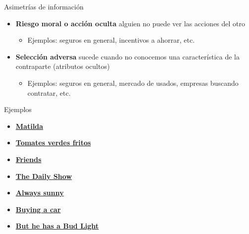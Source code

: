 \documentclass{beamer}
\begin{document}
\begin{frame}{Asimetrías de información}
    \begin{itemize}
        \item {\textbf{Riesgo moral o acción oculta}} alguien no puede ver las acciones del otro
            \begin{itemize}
            \item Ejemplos: seguros en general, incentivos a ahorrar, etc. 
            \end{itemize}
            \vspace{3mm}
        \item {\textbf{Selección adversa}} sucede cuando no conocemos una característica de la contraparte (atributos ocultos)
            \begin{itemize}
            \item Ejemplos: seguros en general, mercado de usados, empresas buscando contratar, etc.  
            \end{itemize}
            \end{itemize}
    \end{frame}

\begin{frame}{Ejemplos}
    \begin{itemize}
    \item \href{https://www.youtube.com/watch?v=qlg0qakJhKU}{\textbf{Matilda}}
    \item \href{https://www.youtube.com/watch?v=akA8co61He4}{\textbf{Tomates verdes fritos}}
    \item \href{https://www.youtube.com/watch?v=X8BPfLhH6MA}{\textbf{Friends}}
    \item \href{https://videos.criticalcommons.org/media/encoded/16/jtierney86/43ba1b1ac3e94df3974f987cc912ae_Hxgbfl1.mp4}{\textbf{The Daily Show}}
    \item \href{http://videos.criticalcommons.org/transcoded/http/www.criticalcommons.org/Members/JJWooten/clips/always-sunny-paying-for-care/video_file/mp4-high/always-sunny-cost-of-care-mp4.mp4}{\textbf{Always sunny}}
    \item \href{https://www.youtube.com/watch?v=SrPu-xGrKrk}{\textbf{Buying a car}}
    \item \href{https://www.youtube.com/watch?v=ZZq0ShjEd-E}{\textbf{But he has a Bud Light}}
    \end{itemize}

\end{frame}
    
\end{document}
